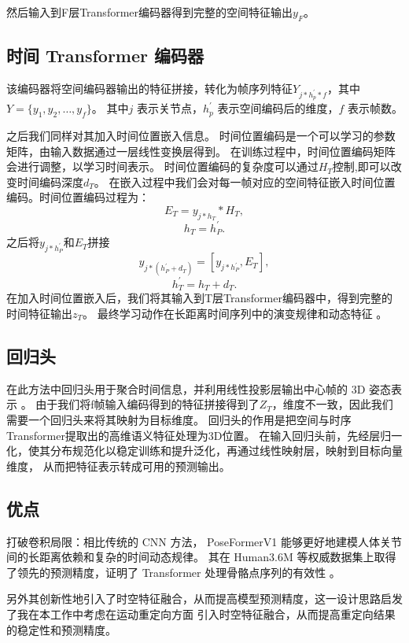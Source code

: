 然后输入到F层Transformer编码器得到完整的空间特征输出$y_{F}$。
\subsection{时间 Transformer 编码器}
该编码器将空间编码器输出的特征拼接，转化为帧序列特征$Y_{j*h^{'}_{p}*f}$，其中
$Y = \{y_1, y_2, \ldots, y_f\}$。
其中$j$ 表示关节点，$h^{'}_{p}$ 表示空间编码后的维度，$f$ 表示帧数。

之后我们同样对其加入时间位置嵌入信息。
时间位置编码是一个可以学习的参数矩阵，由输入数据通过一层线性变换层得到。
在训练过程中，时间位置编码矩阵会进行调整，以学习时间表示。
时间位置编码的复杂度可以通过$H_{T}$控制,即可以改变时间编码深度$d_{T}$。
在嵌入过程中我们会对每一帧对应的空间特征嵌入时间位置编码。时间位置编码过程为：
\begin{equation}
  E_{T} = y_{j*h_{T}} * H_{T},
\end{equation}
\begin{equation}
h_{T} = h^{'}_{P}.
\end{equation}
之后将$y_{j*h^{'}_{P}}$和$E_{T}$拼接
\begin{equation}
y_{j*(h^{'}_{P}+d_{T})} = [y_{j*h^{'}_{P}} , E_{T}],
\end{equation}
\begin{equation}
h^{'}_{T} = h_{T}+d_{T}.
\end{equation}
在加入时间位置嵌入后，我们将其输入到T层Transformer编码器中，得到完整的时间特征输出$z_{T}$。
最终学习动作在长距离时间序列中的演变规律和动态特征 。
\subsection{回归头}
在此方法中回归头用于聚合时间信息，并利用线性投影层输出中心帧的 3D 姿态表示 。
由于我们将f帧输入编码得到的特征拼接得到了$Z_{T}$，维度不一致，因此我们需要一个回归头来将其映射为目标维度。
回归头的作用是把空间与时序Transformer提取出的高维语义特征处理为3D位置。
在输入回归头前，先经层归一化，使其分布规范化以稳定训练和提升泛化，再通过线性映射层，映射到目标向量维度，
从而把特征表示转成可用的预测输出。
\subsection{优点}
打破卷积局限：相比传统的 CNN 方法，
PoseFormerV1 能够更好地建模人体关节间的长距离依赖和复杂的时间动态规律。
其在 Human3.6M 等权威数据集上取得了领先的预测精度，证明了 Transformer 处理骨骼点序列的有效性 。

另外其创新性地引入了时空特征融合，从而提高模型预测精度，这一设计思路启发了我在本工作中考虑在运动重定向方面
引入时空特征融合，从而提高重定向结果的稳定性和预测精度。
